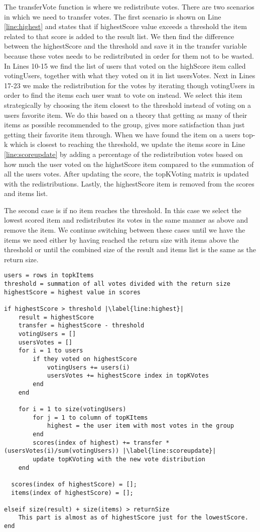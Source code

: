 The transferVote function is where we redistribute votes. There are two scenarios in which we need to transfer votes. The first scenario is shown on Line \ref{line:highest} and states that if highestScore value exceeds a threshold the item related to that score is added to the result list. We then find the difference between the highestScore and the threshold and save it in the transfer variable because these votes needs to be redistributed in order for them not to be wasted. In Lines 10-15 we find the list of users that voted on the highScore item  called votingUsers, together with what they voted on it in list usersVotes. Next in Lines 17-23 we make the redistribution for the votes by iterating though votingUsers in order to find the items each user want to vote on instead. We select this item strategically by choosing the item closest to the threshold instead of voting on a users favorite item. We do this based on a theory that getting as many of their items as possible recommended to the group, gives more satisfaction than just getting their favorite item through. When we have found the item on a users top-k which is closest to reaching the threshold, we update the items score in Line \ref{line:scoreupdate} by adding a percentage of the redistribution votes based on how much the user voted on the highstScore item compared to the summation of all the users votes. After updating the score, the topKVoting matrix is updated with the redistributions. Lastly, the highestScore item is removed from the scores and items list. 

The second case is if no item reaches the threshold. In this case we select the lowest scored item and redistributes its votes in the same manner as above and remove the item. We continue switching between these cases until we have the items we need either by having reached the return size with items above the threshold or until the combined size of the result and items list is the same as the return size.

\begin{lstlisting}[caption={Implementation for the transfer method},label=lst:BTCtransfer,escapechar=|]
users = rows in topkItems
threshold = summation of all votes divided with the return size
highestScore = highest value in scores

if highestScore > threshold |\label{line:highest}|
	result = highestScore
	transfer = highestScore - threshold
	votingUsers = []
	usersVotes = []
	for i = 1 to users 
		if they voted on highestScore
			votingUsers += users(i)
			usersVotes += highestScore index in topKVotes
		end
	end
		
	for i = 1 to size(votingUsers)
		for j = 1 to column of topKItems
			highest = the user item with most votes in the group
		end
		scores(index of highest) += transfer * (usersVotes(i)/sum(votingUsers)) |\label{line:scoreupdate}|
		update topKVoting with the new vote distribution 
	end
	
  scores(index of highestScore) = [];
  items(index of highestScore) = [];
	
elseif size(result) + size(items) > returnSize
	This part is almost as of highestScore just for the lowestScore.
end

\end{lstlisting}

